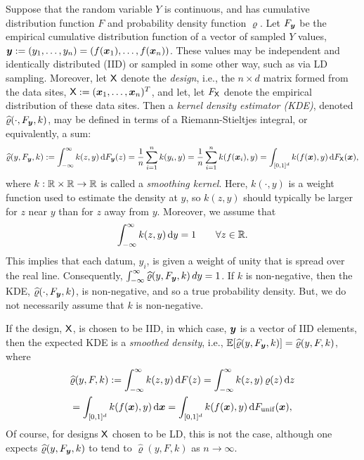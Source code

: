 \documentclass[letterpaper]{amsart}
\newcommand{\hvarrho}{\widehat{\varrho}}
\begin{document}
Suppose that  the random variable $Y$ is continuous, and has cumulative distribution function $F$ and probability density function $\varrho$.  Let $F_{\boldsymbol{y}}$ be the empirical cumulative distribution function of a vector of sampled $Y$ values, $\boldsymbol{y} := (y_1, \ldots, y_n) = (f(\boldsymbol{x}_1), \ldots, f(\boldsymbol{x}_n))$.  These values may be independent and identically distributed (IID) or sampled in some other way, such as via LD sampling.  Moreover, let $\mathsf{X}$ denote the \emph{design}, i.e., the $n \times d$ matrix formed from the data sites, $\mathsf{X}:=(\boldsymbol{x}_1, \ldots, \boldsymbol{x}_n)^T$, and let, let $F_{\mathsf{X}}$ denote the empirical distribution of  these data sites.  Then a \emph{kernel density estimator (KDE)}, denoted $\hvarrho(\cdot,F_{\vy},k)$, may be defined  in terms of a Riemann-Stieltjes integral, or equivalently, a sum:
\begin{equation} \label{eq:kdedef}
	\hvarrho(y,F_{\vy},k) := \int_{-\infty}^{\infty} k(z,y) \, \dif F_{\vy}(z)  = \frac 1n \sum_{i=1}^n k(y_i,y) \\
	= \frac 1n \sum_{i=1}^n k(f(\vx_i),y) = \int_{[0,1]^d} k(f(\vx),y) \, \dif F_\mX(\vx),
\end{equation}
where $k:\mathbb{R} \times \mathbb{R} \to \mathbb{R}$ is called a \emph{smoothing kernel}.  Here, $k(\cdot,y)$ is a weight function used to estimate the density at $y$, so $k(z,y)$ should typically be larger for $z$ near $y$ than for $z$ away from $y$.   Moreover, we assume that
\begin{equation}
	\label{eq:kintegral}
	\int_{-\infty}^{\infty} k(z,y) \, {\rm d} y = 1 \qquad \forall z \in \mathbb{R}.
\end{equation}
This implies that each datum, $y_i$, is given a weight of unity that is spread over the real line.  Consequently, $\int_{-\infty}^{\infty} \hvarrho(y,F_{\vy},k) \, dy = 1$.  If $k$ is non-negative, then the KDE, $\hvarrho(\cdot,F_{\vy},k)$, is non-negative, and so a true probability density.  But, we do not necessarily assume that $k$ is non-negative.

If the design, $\mathsf{X}$, is chosen to be IID, in which case, $\boldsymbol{y}$ is a vector of IID elements, then the expected KDE is a \emph{smoothed density}, i.e., $\Ex[\hvarrho(y,F_{\vy},k)] = \hvarrho(y,F,k)$, where
\begin{multline}
	\label{eq:smoothdens}
	\hvarrho(y,F,k) := \int_{-\infty}^{\infty} k(z,y) \, \dif F(z)
	= \int_{-\infty}^{\infty} k(z,y) \, \varrho(z) \, \dif z \\
	= \int_{[0,1]^d} k(f(\vx),y) \,  \dif \vx
	= \int_{[0,1]^d} k(f(\vx),y) \,  \dif F_{\mathrm{unif}}(\vx),
\end{multline}
Of course, for designs $\mathsf{X}$ chosen to be LD, this is not the case, although one expects $\hvarrho(y,F_{\vy},k)$ to tend to $\hvarrho(y,F,k)$ as $n \to \infty$.
\end{document}
